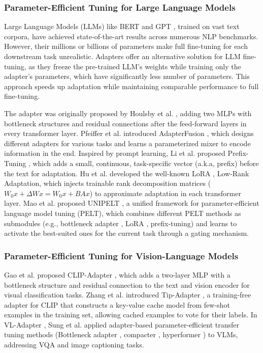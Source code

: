 \documentclass[journal]{IEEEtran}
\begin{document}
\subsubsection{Parameter-Efficient Tuning for Large Language Models}

Large Language Models (LLMs) like BERT \cite{bert} and GPT \cite{gpt}, trained on vast text corpora, have achieved state-of-the-art results across numerous NLP benchmarks. However, their millions or billions of parameters make full fine-tuning for each downstream task unrealistic. Adapters offer an alternative solution for LLM fine-tuning, as they freeze the pre-trained LLM's weights while training only the adapter's parameters, which have significantly less number of parameters. This approach speeds up adaptation while maintaining comparable performance to full fine-tuning. 

The adapter was originally proposed by Houlsby et al. \cite{houlsby2019parameterefficient}, adding two MLPs with bottleneck structures and residual connections after the feed-forward layers in every transformer layer. Pfeiffer et al. introduced AdapterFusion \cite{pfeiffer2021adapterfusion}, which designs different adapters for various tasks and learns a parameterized mixer to encode information in the end. Inspired by prompt learning, Li et al. proposed Prefix-Tuning \cite{li2021prefixtuning}, which adds a small, continuous, task-specific vector (a.k.a, prefix) before the text for adaptation. Hu et al. developed the well-known LoRA \cite{hu2021lora}, Low-Rank Adaptation, which injects trainable rank decomposition matrices ($W_0 x+\Delta W x=W_0 x+B A x$) to approximate adaptation in each transformer layer. Mao et al. proposed UNIPELT \cite{unipelt}, a unified framework for parameter-efficient language model tuning (PELT), which combines different PELT methods as submodules (e.g., bottleneck adapter \cite{houlsby2019parameterefficient}, LoRA \cite{hu2021lora}, prefix-tuning\cite{li2021prefixtuning}) and learns to activate the best-suited ones for the current task through a gating mechanism.


\subsubsection{Parameter-Efficient Tuning for Vision-Language Models}
Gao et al. proposed CLIP-Adapter \cite{clipadapter}, which adds a two-layer MLP with a bottleneck structure and residual connection to the text and vision encoder for visual classification tasks. Zhang et al. introduced Tip-Adapter \cite{tipadapter}, a training-free adapter for CLIP that constructs a key-value cache model from few-shot examples in the training set, allowing cached examples to vote for their labels. In VL-Adapter \cite{vladapter}, Sung et al. applied adapter-based parameter-efficient transfer tuning methods (Bottleneck adapter \cite{houlsby2019parameterefficient}, compacter \cite{compacter}, hyperformer \cite{hyperformer}) to VLMs, addressing VQA and image captioning tasks.
\end{document}
